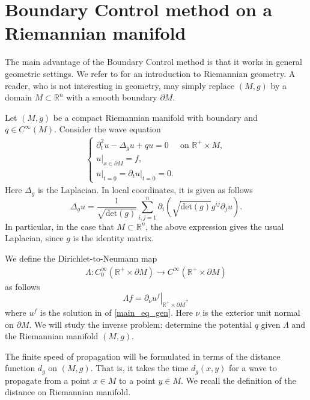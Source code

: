 \documentclass[12pt,oneside,final]{amsart}
\def\R{\mathbb R}
\begin{document}
\section{Boundary Control method on a Riemannian manifold}

The main advantage of the Boundary Control method is that it works in general geometric settings. 
We refer to \cite{Lee} for an introduction to Riemannian geometry. A reader, who is not interesting in geometry, may simply replace $(M,g)$ by a domain $M \subset \R^n$ with a smooth boundary $\partial M$. 


Let $(M,g)$ be a compact Riemannian manifold with boundary and $q\in C^{\infty}(M)$. Consider the wave equation 
    \begin{align}\label{main_eq_gen}
\begin{cases}
\partial_t^2 u - \Delta_g u + q u = 0 & \text{on } \mathbb{R}^+ \times M,
\\
\left.u\right|_{x \in \partial M} = f,
\\
\left.u\right|_{t = 0} = \left.\partial_t u\right|_{t=0} = 0.
\end{cases}
    \end{align}
Here $\Delta_g$ is the Laplacian. In local coordinates, it is given as follows 
\begin{equation*}
	\Delta_g u = \frac{1}{\sqrt{\textrm{det}(g)}} \sum_{i,j=1}^{n} \partial_i \left(\sqrt{\textrm{det}(g)} g^{ij}\partial_j u\right).
\end{equation*}
In particular, in the case that $M \subset \R^n$, the above expression gives the usual Laplacian, since $g$ is the identity matrix.


We define the Dirichlet-to-Neumann map 
	\begin{align*}
\Lambda: C_0^\infty(\mathbb{R}^+\times \partial M) \rightarrow C^\infty(\mathbb{R}^+\times \partial M)
	\end{align*}
 as follows
\begin{equation*}
	\Lambda f =\left.\partial_\nu u^f\right|_{\mathbb{R}^+\times\partial M},
\end{equation*}
where $u^f$ is the solution in of \eqref{main_eq_gen}.
Here $\nu$ is the exterior unit normal on $\partial M$.
We will study the inverse problem: determine the potential $q$ given $\Lambda$ and the Riemannian manifold $(M,g)$. 


The finite speed of propagation will be formulated in terms of the  distance function $d_g$ on $(M,g)$. That is, it takes the time $d_g(x,y)$ for a wave to propagate from a point $x \in M$ to a point $y \in M$.
We recall the definition of the distance on Riemannian manifold. 
\end{document}
